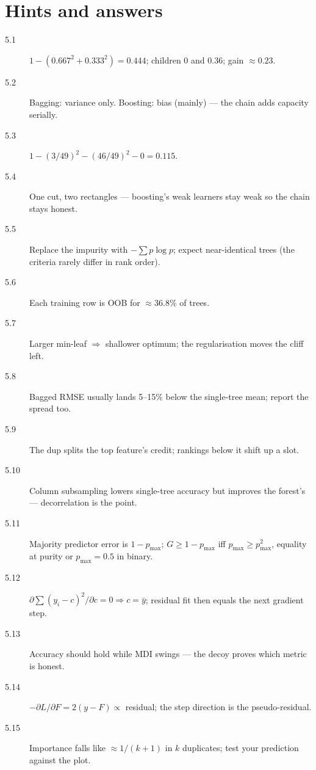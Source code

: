 \section*{Hints and answers}
\begin{description}
\item[5.1] $1 - (0.667^2 + 0.333^2) = 0.444$; children $0$ and $0.36$;
  gain $\approx 0.23$.
\item[5.2] Bagging: variance only. Boosting: bias (mainly) --- the chain
  adds capacity serially.
\item[5.3] $1 - (3/49)^2 - (46/49)^2 - 0 = 0.115$.
\item[5.4] One cut, two rectangles --- boosting's weak learners stay
  weak so the chain stays honest.
\item[5.5] Replace the impurity with
  $-\sum p\log p$; expect near-identical trees (the criteria rarely
  differ in rank order).
\item[5.6] Each training row is OOB for $\approx 36.8\%$ of trees.
\item[5.7] Larger min-leaf $\Rightarrow$ shallower optimum; the
  regularisation moves the cliff left.
\item[5.8] Bagged RMSE usually lands 5--15\% below the single-tree mean;
  report the spread too.
\item[5.9] The dup splits the top feature's credit; rankings below it
  shift up a slot.
\item[5.10] Column subsampling lowers single-tree accuracy but improves
  the forest's --- decorrelation is the point.
\item[5.11] Majority predictor error is $1 - p_{\max}$; $G \ge 1 -
  p_{\max}$ iff $p_{\max} \ge p_{\max}^2$, equality at purity or
  $p_{\max}{=}0.5$ in binary.
\item[5.12] $\partial \sum (y_i - c)^2/\partial c = 0 \Rightarrow c =
  \bar y$; residual fit then equals the next gradient step.
\item[5.13] Accuracy should hold while MDI swings --- the decoy proves
  which metric is honest.
\item[5.14] $-\partial L/\partial F = 2(y - F) \propto$ residual; the
  step direction is the pseudo-residual.
\item[5.15] Importance falls like $\approx 1/(k+1)$ in $k$ duplicates;
  test your prediction against the plot.
\end{description}
